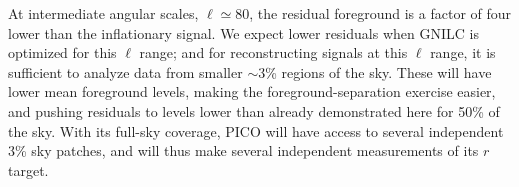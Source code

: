 \documentclass[PICOReport.tex]{subfiles}
\begin{document}
At intermediate angular scales, $\ell \simeq 80$, the residual foreground is a factor of four lower than the inflationary signal. We expect lower residuals when GNILC is optimized for this $\ell$ range; and for reconstructing signals at this $\ell$ range, it is sufficient to analyze data from smaller $\sim$3\% regions of the sky. These will have lower mean foreground levels, making the foreground-separation exercise easier, and pushing residuals to levels lower than already demonstrated here for 50\% of the sky. With its full-sky coverage, PICO will have access to several independent 3\% sky patches, and will thus make several independent measurements of its $r$ target. 





\end{document}

